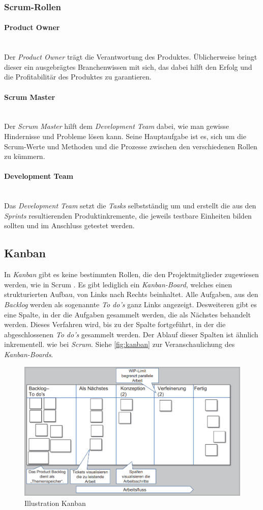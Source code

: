 \subsubsection{Scrum-Rollen}
\paragraph{Product Owner}~\\
Der \textit{Product Owner} trägt die Verantwortung des Produktes. Üblicherweise bringt dieser ein ausgebrägtes Branchenwissen mit sich, das dabei hilft den Erfolg und die Profitabilitär des Produktes zu garantieren.
\paragraph{Scrum Master}~\\
Der \textit{Scrum Master} hilft dem \textit{Development Team} dabei, wie man gewisse Hindernisse und Probleme lösen kann. Seine Hauptaufgabe ist es, sich um die Scrum-Werte und Methoden und die Prozesse zwischen den verschiedenen Rollen zu kümmern.
\paragraph{Development Team}~\\
Das \textit{Development Team} setzt die \textit{Tasks} selbstständig um und erstellt die aus den \textit{Sprints} resultierenden Produktinkremente, die jeweils testbare Einheiten bilden sollten und im Anschluss getestet werden.

\subsection{Kanban}
In \textit{Kanban} gibt es keine bestimmten Rollen, die den Projektmitglieder zugewiesen werden, wie in Scrum \cite{pm-agil-ursula}. Es gibt lediglich ein \textit{Kanban-Board}, welches einen strukturierten Aufbau, von Links nach Rechts beinhaltet. Alle Aufgaben, aus den \textit{Backlog} werden als sogenannte \textit{To do's} ganz Links angezeigt. Desweiteren gibt es eine Spalte, in der die Aufgaben gesammelt werden, die als Nächstes behandelt werden. Dieses Verfahren wird, bis zu der Spalte fortgeführt, in der die abgeschlossenen \textit{To do's} gesammelt werden. Der Ablauf dieser Spalten ist ähnlich inkrementell. wie bei \textit{Scrum}. Siehe \autoref{fig:kanban} zur Veranschaulichung des \textit{Kanban-Boards}. 
\begin{figure}[H]
	\centering
	\includegraphics[width=0.6\linewidth]{images/projektmanagement/kanban}
	\caption[Kanban]{Illustration Kanban \cite{pm-agil-ursula}}
	\label{fig:kanban}
\end{figure}
